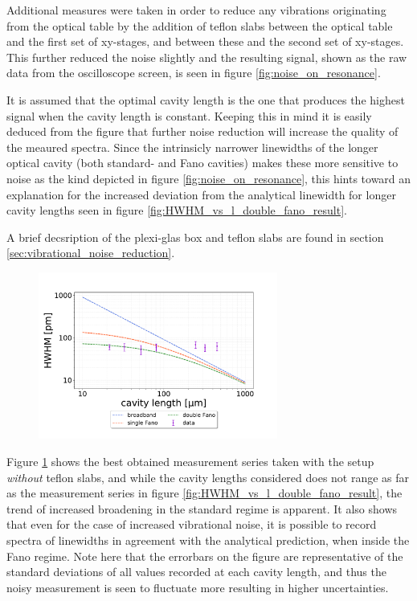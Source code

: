 Additional measures were taken in order to reduce any vibrations originating from the optical table by the addition of teflon slabs between the optical table and the first set of xy-stages, and between these and the second set of xy-stages. This further reduced the noise slightly and the resulting signal, shown as the raw data from the oscilloscope screen, is seen in figure \ref{fig:noise_on_resonance}.

It is assumed that the optimal cavity length is the one that produces the highest signal when the cavity length is constant. Keeping this in mind it is easily deduced from the figure that further noise reduction will increase the quality of the meaured spectra. Since the intrinsicly narrower linewidths of the longer optical cavity (both standard- and Fano cavities) makes these more sensitive to noise as the kind depicted in figure \ref{fig:noise_on_resonance}, this hints toward an explanation for the increased deviation from the analytical linewidth for longer cavity lengths seen in figure \ref{fig:HWHM_vs_l_double_fano_result}.

A brief decsription of the plexi-glas box and teflon slabs are found in section \ref{sec:vibrational_noise_reduction}.

\begin{figure}[h!]
    \centering
    \includegraphics[width=0.7\textwidth]{figures/results/double fano fits/HWHM_vs_cavity_length_result_2nd_measurement_only.pdf}
    \caption{}
    \label{fig:HWHM_vs_l_double_fano_noisy}
\end{figure}

Figure \ref{fig:HWHM_vs_l_double_fano_noisy} shows the best obtained measurement series taken with the setup \emph{without} teflon slabs, and while the cavity lengths considered does not range as far as the measurement series in figure \ref{fig:HWHM_vs_l_double_fano_result}, the trend of increased broadening in the standard regime is apparent. It also shows that even for the case of increased vibrational noise, it is possible to record spectra of linewidths in agreement with the analytical prediction, when inside the Fano regime. Note here that the errorbars on the figure are representative of the standard deviations of all values recorded at each cavity length, and thus the noisy measurement is seen to fluctuate more resulting in higher uncertainties. 

